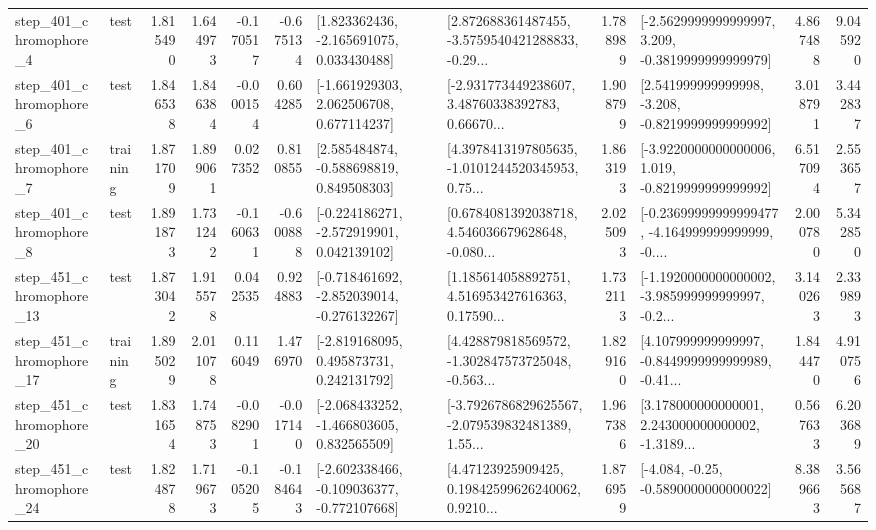 \begin{tabular}{llrrrrllrlrr}
   step\_401\_chromophore\_4 &      test &      1.815490 &    1.644973 &     -0.170517 & -0.675134 &    [1.823362436, -2.165691075, 0.033430488] &  [2.872688361487455, -3.5759540421288833, -0.29... &       1.788989 &  [-2.5629999999999997, 3.209, -0.3819999999999979] &            4.867488 &          9.045920 \\
   step\_401\_chromophore\_6 &      test &      1.846538 &    1.846384 &     -0.000154 &  0.604285 &    [-1.661929303, 2.062506708, 0.677114237] &  [-2.931773449238607, 3.48760338392783, 0.66670... &       1.908799 &   [2.541999999999998, -3.208, -0.8219999999999992] &            3.018791 &          3.442837 \\
   step\_401\_chromophore\_7 &  training &      1.871709 &    1.899061 &      0.027352 &  0.810855 &    [2.585484874, -0.588698819, 0.849508303] &  [4.3978413197805635, -1.0101244520345953, 0.75... &       1.863193 &  [-3.9220000000000006, 1.019, -0.8219999999999992] &            6.517094 &          2.553657 \\
   step\_401\_chromophore\_8 &      test &      1.891873 &    1.731242 &     -0.160631 & -0.600888 &   [-0.224186271, -2.572919901, 0.042139102] &  [0.6784081392038718, 4.546036679628648, -0.080... &       2.025093 &  [-0.23699999999999477, -4.164999999999999, -0.... &            2.000780 &          5.342850 \\
  step\_451\_chromophore\_13 &      test &      1.873042 &    1.915578 &      0.042535 &  0.924883 &  [-0.718461692, -2.852039014, -0.276132267] &  [1.185614058892751, 4.516953427616363, 0.17590... &       1.732113 &  [-1.1920000000000002, -3.985999999999997, -0.2... &            3.140263 &          2.339893 \\
  step\_451\_chromophore\_17 &  training &      1.895029 &    2.011078 &      0.116049 &  1.476970 &    [-2.819168095, 0.495873731, 0.242131792] &  [4.428879818569572, -1.302847573725048, -0.563... &       1.829160 &  [4.107999999999997, -0.8449999999999989, -0.41... &            1.844470 &          4.910756 \\
  step\_451\_chromophore\_20 &      test &      1.831654 &    1.748753 &     -0.082901 & -0.017140 &   [-2.068433252, -1.466803605, 0.832565509] &  [-3.7926786829625567, -2.079539832481389, 1.55... &       1.967386 &  [3.178000000000001, 2.243000000000002, -1.3189... &            0.567633 &          6.203689 \\
  step\_451\_chromophore\_24 &      test &      1.824878 &    1.719673 &     -0.105205 & -0.184643 &  [-2.602338466, -0.109036377, -0.772107668] &  [4.47123925909425, 0.19842599626240062, 0.9210... &       1.876959 &               [-4.084, -0.25, -0.5890000000000022] &            8.389663 &          3.565687 \\

\end{tabular}
